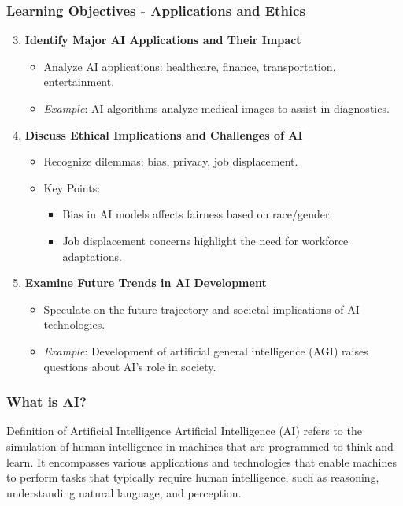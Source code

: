 \documentclass[aspectratio=169]{beamer}
\begin{document}
\begin{frame}[fragile]
    \frametitle{Learning Objectives - Applications and Ethics}
    \begin{enumerate}
        \setcounter{enumi}{2} %
        \item \textbf{Identify Major AI Applications and Their Impact}
        \begin{itemize}
            \item Analyze AI applications: healthcare, finance, transportation, entertainment.
            \item \textit{Example}: AI algorithms analyze medical images to assist in diagnostics.
        \end{itemize}

        \item \textbf{Discuss Ethical Implications and Challenges of AI}
        \begin{itemize}
            \item Recognize dilemmas: bias, privacy, job displacement.
            \item Key Points:
            \begin{itemize}
                \item Bias in AI models affects fairness based on race/gender.
                \item Job displacement concerns highlight the need for workforce adaptations.
            \end{itemize}
        \end{itemize}
        
        \item \textbf{Examine Future Trends in AI Development}
        \begin{itemize}
            \item Speculate on the future trajectory and societal implications of AI technologies.
            \item \textit{Example}: Development of artificial general intelligence (AGI) raises questions about AI's role in society.
        \end{itemize}
    \end{enumerate}
\end{frame}

\begin{frame}[fragile]
    \frametitle{What is AI?}

    \begin{block}{Definition of Artificial Intelligence}
        Artificial Intelligence (AI) refers to the simulation of human intelligence in machines that are programmed to think and learn. 
        It encompasses various applications and technologies that enable machines to perform tasks that typically require human intelligence, 
        such as reasoning, understanding natural language, and perception.
    \end{block}
\end{frame}
\end{document}
